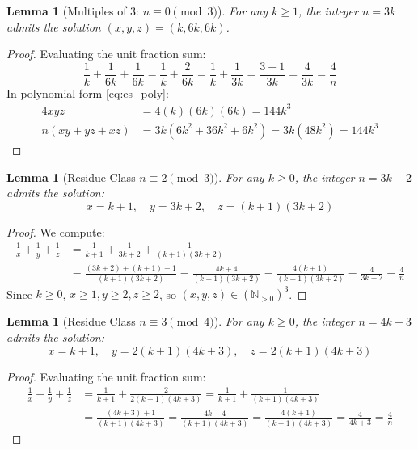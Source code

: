 \documentclass[11pt,a4paper]{article}
\newtheorem{lemma}[theorem]{Lemma}
\theoremstyle{definition}
\begin{document}
\begin{lemma}[Multiples of 3: $n \equiv 0 \pmod 3$]\label{lem:mod3_0}
For any $k \ge 1$, the integer $n = 3k$ admits the solution $(x,y,z) = (k, 6k, 6k)$.
\end{lemma}
\begin{proof}
Evaluating the unit fraction sum:
\[ \frac{1}{k} + \frac{1}{6k} + \frac{1}{6k} = \frac{1}{k} + \frac{2}{6k} = \frac{1}{k} + \frac{1}{3k} = \frac{3 + 1}{3k} = \frac{4}{3k} = \frac{4}{n} \]
In polynomial form \eqref{eq:es_poly}:
\begin{align*}
4 x y z &= 4 (k)(6k)(6k) = 144 k^3 \\
n (x y + y z + x z) &= 3k \left( 6k^2 + 36k^2 + 6k^2 \right) = 3k (48k^2) = 144 k^3
\end{align*}
\end{proof}

\begin{lemma}[Residue Class $n \equiv 2 \pmod 3$]\label{lem:mod3_2}
For any $k \ge 0$, the integer $n = 3k+2$ admits the solution:
\[ x = k+1, \quad y = 3k+2, \quad z = (k+1)(3k+2) \]
\end{lemma}
\begin{proof}
We compute:
\begin{align*}
\frac{1}{x} + \frac{1}{y} + \frac{1}{z} &= \frac{1}{k+1} + \frac{1}{3k+2} + \frac{1}{(k+1)(3k+2)} \\
&= \frac{(3k+2) + (k+1) + 1}{(k+1)(3k+2)} = \frac{4k+4}{(k+1)(3k+2)} = \frac{4(k+1)}{(k+1)(3k+2)} = \frac{4}{3k+2} = \frac{4}{n}
\end{align*}
Since $k \ge 0$, $x \ge 1, y \ge 2, z \ge 2$, so $(x,y,z) \in (\mathbb{N}_{>0})^3$.
\end{proof}

\begin{lemma}[Residue Class $n \equiv 3 \pmod 4$]\label{lem:mod4_3}
For any $k \ge 0$, the integer $n = 4k+3$ admits the solution:
\[ x = k+1, \quad y = 2(k+1)(4k+3), \quad z = 2(k+1)(4k+3) \]
\end{lemma}
\begin{proof}
Evaluating the unit fraction sum:
\begin{align*}
\frac{1}{x} + \frac{1}{y} + \frac{1}{z} &= \frac{1}{k+1} + \frac{2}{2(k+1)(4k+3)} = \frac{1}{k+1} + \frac{1}{(k+1)(4k+3)} \\
&= \frac{(4k+3) + 1}{(k+1)(4k+3)} = \frac{4k+4}{(k+1)(4k+3)} = \frac{4(k+1)}{(k+1)(4k+3)} = \frac{4}{4k+3} = \frac{4}{n}
\end{align*}
\end{proof}
\end{document}

